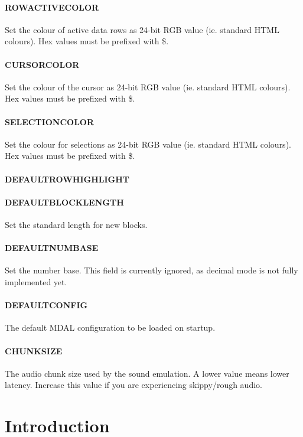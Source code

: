 \documentclass[12pt]{report}	%
\begin{document}
\subsubsection{ROWACTIVECOLOR}
Set the colour of active data rows as 24-bit RGB value (ie. standard HTML colours). Hex values must be prefixed with \$.

\subsubsection{CURSORCOLOR}
Set the colour of the cursor as 24-bit RGB value (ie. standard HTML colours). Hex values must be prefixed with \$.

\subsubsection{SELECTIONCOLOR}
Set the colour for selections as 24-bit RGB value (ie. standard HTML colours). Hex values must be prefixed with \$.

\subsubsection{DEFAULTROWHIGHLIGHT}

\subsubsection{DEFAULTBLOCKLENGTH}
Set the standard length for new blocks.

\subsubsection{DEFAULTNUMBASE}
Set the number base. This field is currently ignored, as decimal mode is not fully implemented yet.

\subsubsection{DEFAULTCONFIG}
The default MDAL configuration to be loaded on startup.

\subsubsection{CHUNKSIZE}
The audio chunk size used by the sound emulation. A lower value means lower latency. Increase this value if you are experiencing skippy/rough audio.


\chapter{Introduction}
\end{document}
